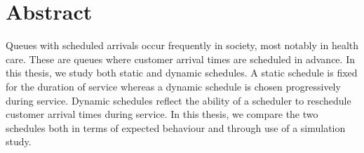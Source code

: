 \chapter*{Abstract}

Queues with scheduled arrivals occur frequently in society, most notably in health care. These are queues where customer arrival times are scheduled in advance. In this thesis, we study both static and dynamic schedules. A static schedule is fixed for the duration of service whereas a dynamic schedule is chosen progressively during service. Dynamic schedules reflect the ability of a scheduler to reschedule customer arrival times during service. In this thesis, we compare the two schedules both in terms of expected behaviour and through use of a simulation study.